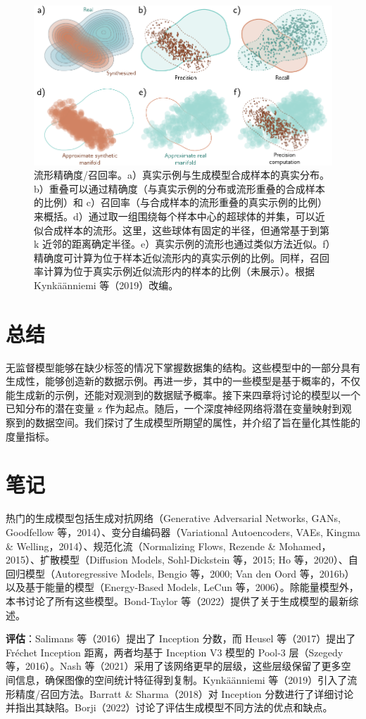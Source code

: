 \documentclass[lang=cn,newtx,10pt,scheme=chinese]{elegantbook}
\begin{document}
\begin{figure}[ht!]
\centering
\includegraphics[width=0.7\linewidth]{PDFFigures/UDLChap14PDF/UnsupPrecisionRecall.pdf}
\caption{流形精确度/召回率。a）真实示例与生成模型合成样本的真实分布。b）重叠可以通过精确度（与真实示例的分布或流形重叠的合成样本的比例）和 c）召回率（与合成样本的流形重叠的真实示例的比例）来概括。d）通过取一组围绕每个样本中心的超球体的并集，可以近似合成样本的流形。这里，这些球体有固定的半径，但通常基于到第 k 近邻的距离确定半径。e）真实示例的流形也通过类似方法近似。f）精确度可计算为位于样本近似流形内的真实示例的比例。同样，召回率计算为位于真实示例近似流形内的样本的比例（未展示）。根据 Kynkäänniemi 等（2019）改编。}
\end{figure}

\section{总结}
无监督模型能够在缺少标签的情况下掌握数据集的结构。这些模型中的一部分具有生成性，能够创造新的数据示例。再进一步，其中的一些模型是基于概率的，不仅能生成新的示例，还能对观测到的数据赋予概率。接下来四章将讨论的模型以一个已知分布的潜在变量 z 作为起点。随后，一个深度神经网络将潜在变量映射到观察到的数据空间。我们探讨了生成模型所期望的属性，并介绍了旨在量化其性能的度量指标。

\section{笔记}
热门的生成模型包括生成对抗网络（Generative Adversarial Networks, GANs, Goodfellow 等，2014）、变分自编码器（Variational Autoencoders, VAEs, Kingma \& Welling，2014）、规范化流（Normalizing Flows, Rezende \& Mohamed，2015）、扩散模型（Diffusion Models, Sohl-Dickstein 等，2015; Ho 等，2020）、自回归模型（Autoregressive Models, Bengio 等，2000; Van den Oord 等，2016b）以及基于能量的模型（Energy-Based Models, LeCun 等，2006）。除能量模型外，本书讨论了所有这些模型。Bond-Taylor 等（2022）提供了关于生成模型的最新综述。

\textbf{评估}：Salimans 等（2016）提出了 Inception 分数，而 Heusel 等（2017）提出了 Fréchet Inception 距离，两者均基于 Inception V3 模型的 Pool-3 层（Szegedy 等，2016）。Nash 等（2021）采用了该网络更早的层级，这些层级保留了更多空间信息，确保图像的空间统计特征得到复制。Kynkäänniemi 等（2019）引入了流形精度/召回方法。Barratt \& Sharma（2018）对 Inception 分数进行了详细讨论并指出其缺陷。Borji（2022）讨论了评估生成模型不同方法的优点和缺点。
\end{document}
